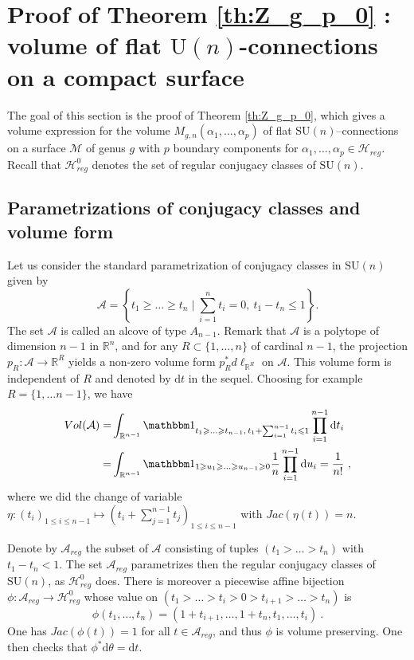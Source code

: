 \documentclass[11pt,a4paper]{amsart}
\providecommand{\diff}{\mathrm d}
\providecommand{\U}{\mathrm U}
\providecommand{\SU}{\mathrm {SU}}
\providecommand{\indic}{\mathbbm 1}
\numberwithin{equation}{section}
\theoremstyle{definition}
\begin{document}
\section{Proof of Theorem \ref{th:Z_g_p_0} : 
volume of flat $\U(n)$-connections on a compact surface}
\label{sec:proof_of_th_flat_connections}

\noindent
The goal of this section is the proof of Theorem \ref{th:Z_g_p_0}, which gives a 
volume expression for the volume $M_{g,n}(\alpha_1,\ldots,\alpha_p)$ of flat $\SU(n)$--connections on a surface $\mathcal{M}$ of 
genus $g$ with $p$ boundary components for $\alpha_1,\ldots,\alpha_p\in\mathcal{H}_{reg}$. 
Recall that $\mathcal{H}_{reg}^0$ denotes the set of regular conjugacy classes of $\SU(n)$.

\subsection{Parametrizations of conjugacy classes and volume form} 

Let us consider the standard parametrization of conjugacy classes in $\SU(n)$ 
given by
$$\mathcal{A}= \left\{t_1\geqslant\ldots\geqslant t_n \mid \sum_{i=1}^nt_i=0, \ t_1-t_n\leqslant 1 \right\}.$$
The set $\mathcal{A}$ is called an alcove of type $A_{n-1}$. 
Remark that $\mathcal{A}$ is a polytope of dimension $n-1$ in $\mathbb{R}^n$, 
and for any $R\subset \{1,\ldots,n\}$ of cardinal $n-1$, the projection 
$p_{R}:\mathcal{A}\rightarrow \mathbb{R}^R$ yields a non-zero volume form 
$p_{R}^{*}d\ell_{\mathbb{R}^R}$ on $\mathcal{A}$. 
This volume form is independent of $R$ and denoted by $\diff t$ in the sequel. 
Choosing for example $R=\{1,\ldots n-1\}$, we have
\begin{align*}
Vol(\mathcal{A})=&\int_{\mathbb{R}^{n-1}}\indic_{t_1\geqslant\ldots\geqslant t_{n-1},\,t_1+\sum_{i=1}^{n-1}t_i\leqslant 1}\prod_{i=1}^{n-1} \diff t_i\\
=&\int_{\mathbb{R}^{n-1}}\indic_{1\geqslant u_1\geqslant\ldots\geqslant u_{n-1}\geqslant 0}\frac{1}{n}\prod_{i=1}^{n-1} \diff u_i=\frac{1}{n!} \ ,
\end{align*}
where we did the change of variable $\eta:(t_i)_{1\leqslant i\leqslant n-1}\mapsto (t_i+\sum_{j=1}^{n-1}t_j)_{1\leqslant i\leqslant n-1}$ with $Jac(\eta(t))=n$.

Denote by $\mathcal{A}_{reg}$ the subset of $\mathcal{A}$ consisting of tuples $(t_1>\ldots>t_n)$ with $t_1-t_n<1$. The set $\mathcal{A}_{reg}$ parametrizes then the regular conjugacy classes of $\SU(n)$, as $\mathcal{H}^0_{reg}$ does. There is moreover a piecewise affine bijection 
$\phi:\mathcal{A}_{reg}\rightarrow\mathcal{H}^0_{reg}$ whose value on $(t_1>\ldots> t_i> 0>t_{i+1}> \dots> t_n)$ is 
\begin{equation}\label{eq:change_parametrization_conjugacy}
\phi(t_1,\ldots,t_n) =(1+t_{i+1},\ldots,1+t_{n},t_1,\ldots,t_{i}) \ .
\end{equation}
One has $Jac(\phi(t))=1$ for all $t\in\mathcal{A}_{reg}$, and thus $\phi$ is volume preserving. One then checks that $\phi^* \diff \theta= \diff t$.
\end{document}
